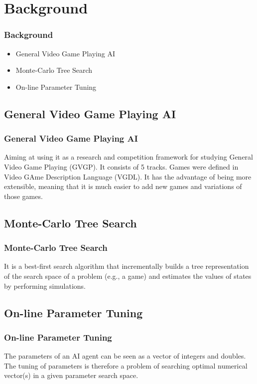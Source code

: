 \documentclass{beamer}
\begin{document}

\section{Background}
\begin{frame}
  \frametitle{Background}
  \begin{itemize}
    \item General Video Game Playing AI
    \item Monte-Carlo Tree Search
    \item On-line Parameter Tuning
  \end{itemize}
  

\end{frame}


\subsection{General Video Game Playing AI}
\begin{frame}
\frametitle{General Video Game Playing AI}
Aiming at using it as a research and competition framework for studying General Video Game Playing (GVGP). It consists of 5 tracks. Games were defined in Video GAme Description Language (VGDL). It has the advantage of being more extensible, meaning that it is much easier to add new games and variations of those games.
\end{frame}

\subsection{Monte-Carlo Tree Search}
\begin{frame}
\frametitle{Monte-Carlo Tree Search}
It is a best-first search algorithm that incrementally builds a tree representation of the search space of a problem (e.g., a game) and estimates the values of states by performing simulations\cite{1}.
\end{frame}

\subsection{On-line Parameter Tuning}
\begin{frame}
\frametitle{On-line Parameter Tuning}
The parameters of an AI agent can be seen as a vector of integers and doubles. The tuning of parameters is therefore a problem of searching optimal numerical vector(s) in a given parameter search space. %
\end{frame}
\end{document}
